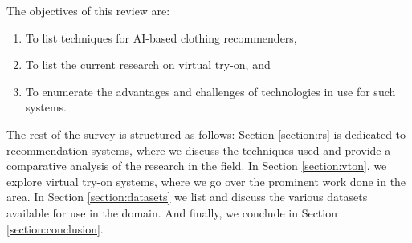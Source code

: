 	The objectives of this review are:

	\begin{enumerate}
		\item To list techniques for AI-based clothing recommenders,
		\item To list the current research on virtual try-on, and
		\item To enumerate the advantages and challenges of technologies in use for such systems.
	\end{enumerate}

	The rest of the survey is structured as follows: Section \ref{section:rs} is dedicated to recommendation systems, where we discuss the techniques used and provide a comparative analysis of the research in the field. In Section \ref{section:vton}, we explore virtual try-on systems, where we go over the prominent work done in the area. In Section \ref{section:datasets} we list and discuss the various datasets available for use in the domain. And finally, we conclude in Section \ref{section:conclusion}.